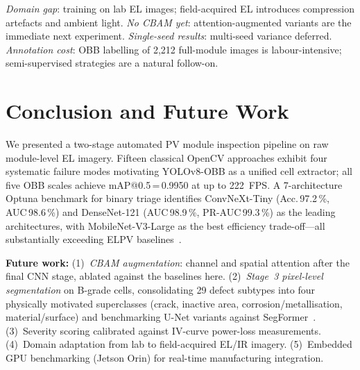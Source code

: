 \documentclass[conference]{IEEEtran}
\begin{document}
\textit{Domain gap}: training on lab EL images; field-acquired EL introduces compression artefacts and ambient light. \textit{No CBAM yet}: attention-augmented variants are the immediate next experiment. \textit{Single-seed results}: multi-seed variance deferred. \textit{Annotation cost}: OBB labelling of 2{,}212 full-module images is labour-intensive; semi-supervised strategies are a natural follow-on.

\section{Conclusion and Future Work}
\label{sec:conclusion}

We presented a two-stage automated PV module inspection pipeline on raw module-level EL imagery. Fifteen classical OpenCV approaches exhibit four systematic failure modes motivating YOLOv8-OBB as a unified cell extractor; all five OBB scales achieve mAP@0.5\,=\,0.9950 at up to 222~FPS. A 7-architecture Optuna benchmark for binary triage identifies ConvNeXt-Tiny (Acc.\,97.2\,\%, AUC\,98.6\,\%) and DenseNet-121 (AUC\,98.9\,\%, PR-AUC\,99.3\,\%) as the leading architectures, with MobileNet-V3-Large as the best efficiency trade-off---all substantially exceeding ELPV baselines~\cite{deitsch2019}.

\textbf{Future work:}
(1)~\textit{CBAM augmentation}: channel and spatial attention after the final CNN stage, ablated against the baselines here.
(2)~\textit{Stage~3 pixel-level segmentation} on B-grade cells, consolidating 29 defect subtypes into four physically motivated superclasses (crack, inactive area, corrosion/metallisation, material/surface) and benchmarking U-Net variants against SegFormer~\cite{xie2021}.
(3)~Severity scoring calibrated against IV-curve power-loss measurements.
(4)~Domain adaptation from lab to field-acquired EL/IR imagery.
(5)~Embedded GPU benchmarking (Jetson Orin) for real-time manufacturing integration.



\end{document}
